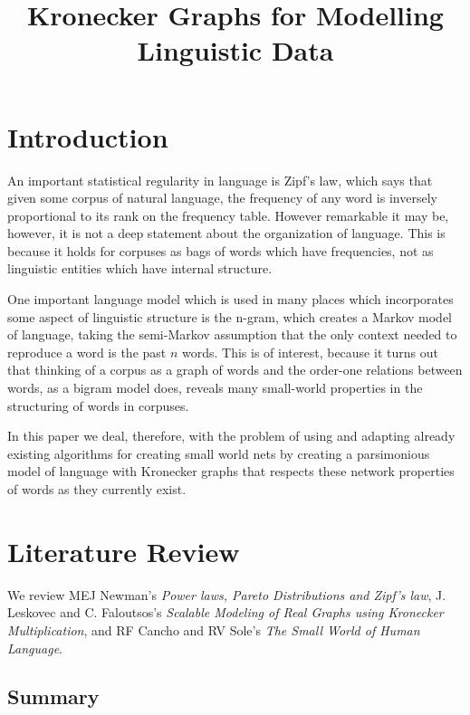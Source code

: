 \documentclass[12pt]{article}
\begin{document}
\title{Kronecker Graphs for Modelling Linguistic Data}

\section{Introduction}

An important statistical regularity in language is Zipf's law, which says that given some corpus of natural language, the frequency of any word is inversely proportional to its rank on the frequency table. However remarkable it may be, however, it is not a deep statement about the organization of language. This is because it holds for corpuses as bags of words which have frequencies, not as linguistic entities which have internal structure. %

One important language model which is used in many places which incorporates some aspect of linguistic structure is the n-gram, which creates a Markov model of language, taking the semi-Markov assumption that the only context needed to reproduce a word is the past $n$ words. This is of interest, because it turns out that thinking of a corpus as a graph of words and the order-one relations between words, as a bigram model does, reveals many small-world properties in the structuring of words in corpuses. %

In this paper we deal, therefore, with the problem of using and adapting already existing algorithms for creating small world nets by creating a parsimonious model of language with Kronecker graphs that respects these network properties of words as they currently exist.

\section{Literature Review}

We review MEJ Newman's \emph{Power laws, Pareto Distributions and Zipf's law}, J. Leskovec and C. Faloutsos's \emph{Scalable Modeling of Real Graphs using Kronecker Multiplication}, and RF Cancho and RV Sole's \emph{The Small World of Human Language}. %

\subsection{Summary}
\end{document}
